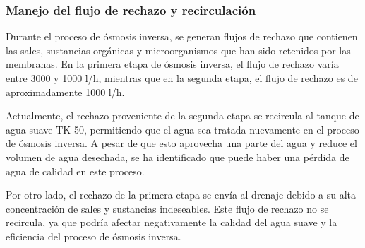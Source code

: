 \subsubsection{Manejo del flujo de rechazo y recirculación}

Durante el proceso de ósmosis inversa, se generan flujos de rechazo que contienen las sales, sustancias orgánicas y microorganismos que han sido retenidos por las membranas. En la primera etapa de ósmosis inversa, el flujo de rechazo varía entre 3000 y 1000 l/h, mientras que en la segunda etapa, el flujo de rechazo es de aproximadamente 1000 l/h.

Actualmente, el rechazo proveniente de la segunda etapa se recircula al tanque de agua suave TK 50, permitiendo que el agua sea tratada nuevamente en el proceso de ósmosis inversa. A pesar de que esto aprovecha una parte del agua y reduce el volumen de agua desechada, se ha identificado que puede haber una pérdida de agua de calidad en este proceso.

Por otro lado, el rechazo de la primera etapa se envía al drenaje debido a su alta concentración de sales y sustancias indeseables. Este flujo de rechazo no se recircula, ya que podría afectar negativamente la calidad del agua suave y la eficiencia del proceso de ósmosis inversa.